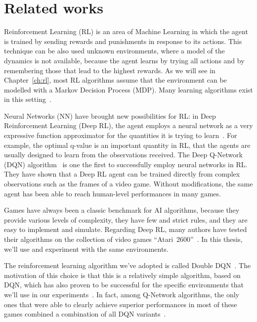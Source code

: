 \section{Related works}

\label{sec:intro-related}

Reinforcement Learning (RL) is an area of Machine Learning in which the agent
is trained by sending rewards and punishments in response to its actions.
This technique can be also used unknown environments, where a model of the
dynamics is not available, because the agent learns by trying all actions and
by remembering those that lead to the highest rewards. As we will see in
Chapter~\ref{ch:rl}, most RL algorithms assume that the environment can be
modelled with a Markov Decision Process (MDP). Many learning algorithms exist
in this setting~\cite{bib:rl-book}.

Neural Networks (NN) have brought new possibilities for RL: in Deep
Reinforcement Learning (Deep RL), the agent employs a neural network as a very
expressive function approximator for the quantities it is trying to
learn~\cite{bib:deep-rl}. For example, the optimal q-value is an important
quantity in RL, that the agents are usually designed to learn from the
observations received. The Deep Q-Network (DQN)
algorithm~\cite{bib:atari-deeprl} is one the first to successfully employ
neural networks in RL. They have shown that a Deep RL agent can be trained
directly from complex observations such as the frames of a video game. Without
modifications, the same agent has been able to reach human-level performances
in many games.

Games have always been a classic benchmark for AI algorithms, because they
provide various levels of complexity, they have few and strict rules, and they
are easy to implement and simulate. Regarding Deep RL, many authors have
tested their algorithms on the collection of video games
``Atari~2600''~\cite{bib:atari-games}. In this thesis, we'll use and
experiment with the same environments.

The reinforcement learning algorithm we've adopted is called Double
DQN~\cite{bib:double-q}. The motivation of this choice is that this is a
relatively simple algorithm, based on DQN, which has also proven to be
successful for the specific environments that we'll use in our
experiments~\cite{bib:atari-deepq-nature}. In fact, among Q-Network
algorithms, the only ones that were able to clearly achieve superior
performances in most of these games combined a combination of all DQN
variants~\cite{bib:rainbow}.

